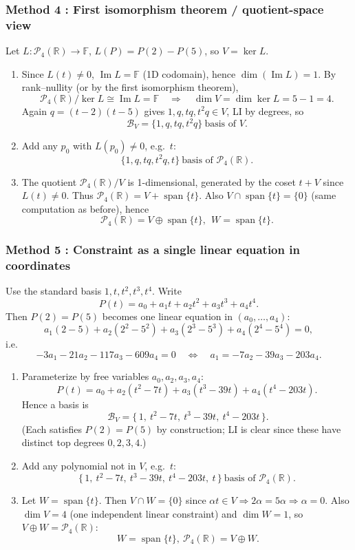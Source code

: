 \documentclass[12pt]{article}
\newcommand{\F}{\mathbb{F}}
\newcommand{\R}{\mathbb{R}}
\newcommand{\Span}{\operatorname{span}}
\newcommand{\Pfour}{\mathcal{P}_4(\R)}
\begin{document}
\subsubsection{Method 4 : First isomorphism theorem / quotient-space view}
Let \(L:\Pfour\to\F\), \(L(P)=P(2)-P(5)\), so \(V=\ker L\).

\begin{enumerate}[label=(\alph*)]
\item Since \(L(t)\ne 0\), \(\operatorname{Im}L=\F\) (1D codomain), hence \(\dim(\operatorname{Im}L)=1\).
By rank--nullity (or by the first isomorphism theorem),
\[
\Pfour/\ker L \cong \operatorname{Im}L=\F\quad\Rightarrow\quad \dim V=\dim\ker L=5-1=4.
\]
Again \(q=(t-2)(t-5)\) gives \(1,q,tq,t^2q\in V\), LI by degrees, so
\[
\boxed{\ \mathcal B_V=\{1,q,tq,t^2q\}\ \text{basis of }V.\ }
\]

\item Add any \(p_0\) with \(L(p_0)\ne 0\), e.g.\ \(t\):
\[
\boxed{\ \{1,q,tq,t^2q,t\}\ \text{basis of }\Pfour.\ }
\]

\item The quotient \(\Pfour/V\) is 1-dimensional, generated by the coset \(t+V\) since \(L(t)\ne 0\).
Thus \(\Pfour=V+\Span\{t\}\). Also \(V\cap\Span\{t\}=\{0\}\) (same computation as before), hence
\[
\boxed{\ \Pfour=V\oplus\Span\{t\},\ \ W=\Span\{t\}.\ }
\]
\end{enumerate}

\subsubsection{Method 5 : Constraint as a single linear equation in coordinates}
Use the standard basis \(1,t,t^2,t^3,t^4\). Write
\[
P(t)=a_0+a_1 t+a_2 t^2+a_3 t^3+a_4 t^4.
\]
Then \(P(2)=P(5)\) becomes one linear equation in \((a_0,\dots,a_4)\):
\[
a_1(2-5)+a_2(2^2-5^2)+a_3(2^3-5^3)+a_4(2^4-5^4)=0,
\]
i.e.
\[
-3a_1-21a_2-117a_3-609a_4=0
\quad\Longleftrightarrow\quad
a_1=-7a_2-39a_3-203a_4.
\]

\begin{enumerate}[label=(\alph*)]
\item Parameterize by free variables \(a_0,a_2,a_3,a_4\):
\[
P(t)=a_0+a_2(t^2-7t)+a_3(t^3-39t)+a_4(t^4-203t).
\]
Hence a basis is
\[
\boxed{\ \mathcal B_V=\{\,1,\ t^2-7t,\ t^3-39t,\ t^4-203t\,\}. }
\]
(Each satisfies \(P(2)=P(5)\) by construction; LI is clear since these have distinct top degrees \(0,2,3,4\).)

\item Add any polynomial not in \(V\), e.g.\ \(t\):
\[
\boxed{\ \{\,1,\ t^2-7t,\ t^3-39t,\ t^4-203t,\ t\,\}\ \text{basis of }\Pfour.\ }
\]

\item Let \(W=\Span\{t\}\). Then \(V\cap W=\{0\}\) since \(\alpha t\in V\Rightarrow 2\alpha=5\alpha\Rightarrow \alpha=0\).
Also \(\dim V=4\) (one independent linear constraint) and \(\dim W=1\), so \(V\oplus W=\Pfour\):
\[
\boxed{\ W=\Span\{t\},\ \Pfour=V\oplus W. }
\]
\end{enumerate}
\end{document}
